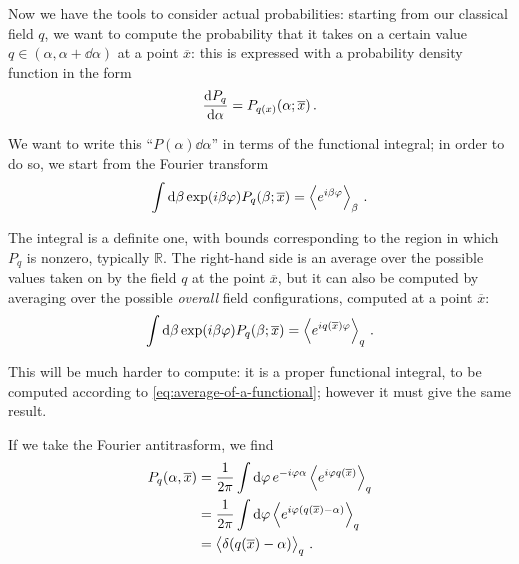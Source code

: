 \documentclass[main.tex]{subfiles}
\begin{document}
Now we have the tools to consider actual probabilities: starting from our classical field \(q\), we want to compute the probability that it takes on a certain value \(q \in (\alpha , \alpha + \dd{\alpha })\) at a point \(\overline{x}\): this is expressed with a probability density function in the form 
%
\begin{align}
\dv{P_q}{\alpha } =P_{q(x)} (\alpha; \overline{x})
\,.
\end{align}

We want to write this ``\(P(\alpha ) \dd{\alpha }\)'' in terms of the functional integral; in order to do so, we start from the Fourier transform 
%
\begin{align}
\int \dd{\beta } \exp(i \beta \varphi ) P_q (\beta ; \overline{x}) = \expval{e^{i \beta \varphi }}_{\beta }
\,.
\end{align}

The integral is a definite one, with bounds corresponding to the region in which \(P_q\) is nonzero, typically \(\mathbb{R}\).
The right-hand side is an average over the possible values taken on by the field \(q\) at the point \(\overline{x}\), but it can also be computed by averaging over the possible \emph{overall} field configurations, computed at a point \(\overline{x}\):
%
\begin{align}
\int \dd{\beta } \exp(i \beta \varphi ) P_q (\beta ; \overline{x}) = \expval{e^{i q(\overline{x}) \varphi }}_{q }
\,.
\end{align}

This will be much harder to compute: it is a proper functional integral, to be computed according to \eqref{eq:average-of-a-functional}; however it must give the same result.


If we take the Fourier antitrasform, we find 
%
\begin{align}
P_q (\alpha , \overline{x}) &= \frac{1}{2 \pi } \int \dd{\varphi } e^{-i \varphi \alpha } \expval{e^{i \varphi q (\overline{x})}}_q  \\
&= \frac{1}{2 \pi } \int \dd{\varphi } \expval{e^{i \varphi (q(\overline{x}) - \alpha )}}_q  \\
&= \expval{ \delta (q(\overline{x}) - \alpha ) }_q
\,.
\end{align}
\end{document}
